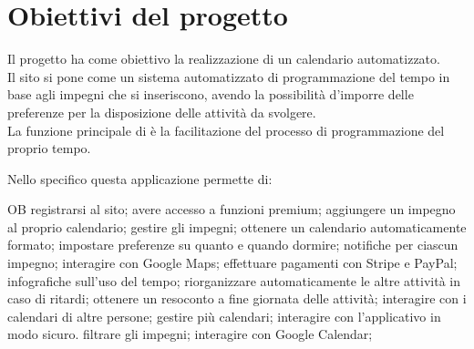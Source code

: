 \section{Obiettivi del progetto}
\label{sec:ObiettiviProgetto}
Il progetto ha come obiettivo la realizzazione di un calendario automatizzato.\\
Il sito si pone come un sistema automatizzato di programmazione del tempo in base agli impegni che si inseriscono, avendo la possibilità d'imporre delle preferenze per la disposizione delle attività da svolgere.\\
La funzione principale di \nome è la facilitazione del processo di programmazione del proprio tempo.

\vspace{0.5cm}

Nello specifico questa applicazione permette di:
\begin {mylist} {OB} 
       registrarsi al sito;
       avere accesso a funzioni premium; 
       aggiungere un impegno al proprio calendario;
       gestire gli impegni; 
       ottenere un calendario automaticamente formato; 
       impostare preferenze su quanto e quando dormire;
       notifiche per ciascun impegno; 
       interagire con Google Maps; 
       effettuare pagamenti con Stripe e PayPal;
       infografiche sull'uso del tempo;
       riorganizzare automaticamente le altre attività in caso di ritardi;
       ottenere un resoconto a fine giornata delle attività;
       interagire con i calendari di altre persone;
       gestire più calendari;
       interagire con l'applicativo in modo sicuro. 
       filtrare gli impegni; 
       interagire con Google Calendar;
      
\end{mylist}
